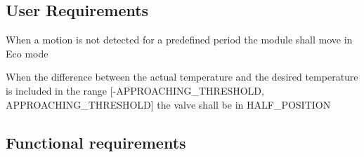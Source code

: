 \newpage
\subsection{User Requirements}
\begin{req_enum}
	\item When a motion is not detected for a predefined period the module shall move in Eco mode
	\item When the difference between the actual temperature and the desired temperature is included in the range 
	[-APPROACHING\_THRESHOLD, APPROACHING\_THRESHOLD] the valve shall be in HALF\_POSITION
\end{req_enum}

\subsection{Functional requirements}
